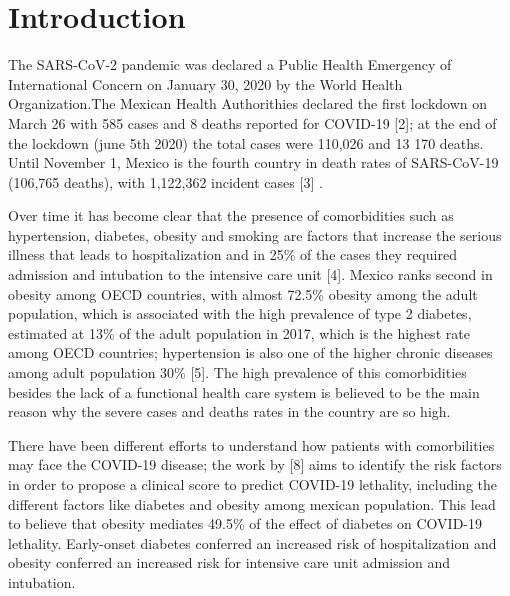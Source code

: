 \documentclass[10pt,letterpaper]{article}
\begin{document}
\linenumbers

\newcommand{\N}{\mathbb{N}}
\newcommand{\Z}{\mathbb{Z}}
\newcommand{\R}{\mathbb{R}}
\newcommand{\Q}{\mathbb{Q}}
\newcommand{\vac}{\varnothing}
\newcommand{\Pro}{\mathbb{P}}
\newcommand{\var}{\text{Var}}
\newcommand{\E}{\mathbb{E}}

\hypertarget{introduction}{%
\section{Introduction}\label{introduction}}

The SARS-CoV-2 pandemic was declared a Public Health Emergency of
International Concern on January 30, 2020 by the World Health
Organization.The Mexican Health Authorithies declared the first lockdown
on March 26 with 585 cases and 8 deaths reported for COVID-19 {[}2{]};
at the end of the lockdown (june 5th 2020) the total cases were 110,026
and 13 170 deaths. Until November 1, Mexico is the fourth country in
death rates of SARS-CoV-19 (106,765 deaths), with 1,122,362 incident
cases {[}3{]} .

Over time it has become clear that the presence of comorbidities such as
hypertension, diabetes, obesity and smoking are factors that increase
the serious illness that leads to hospitalization and in 25\% of the
cases they required admission and intubation to the intensive care unit
{[}4{]}. Mexico ranks second in obesity among OECD countries, with
almost 72.5\% obesity among the adult population, which is associated
with the high prevalence of type 2 diabetes, estimated at 13\% of the
adult population in 2017, which is the highest rate among OECD
countries; hypertension is also one of the higher chronic diseases among
adult population 30\% {[}5{]}. The high prevalence of this comorbidities
besides the lack of a functional health care system is believed to be
the main reason why the severe cases and deaths rates in the country are
so high.

There have been different efforts to understand how patients with
comorbilities may face the COVID-19 disease; the work by {[}8{]} aims to
identify the risk factors in order to propose a clinical score to
predict COVID-19 lethality, including the different factors like
diabetes and obesity among mexican population. This lead to believe that
obesity mediates 49.5\% of the effect of diabetes on COVID-19 lethality.
Early-onset diabetes conferred an increased risk of hospitalization and
obesity conferred an increased risk for intensive care unit admission
and intubation.
\end{document}
